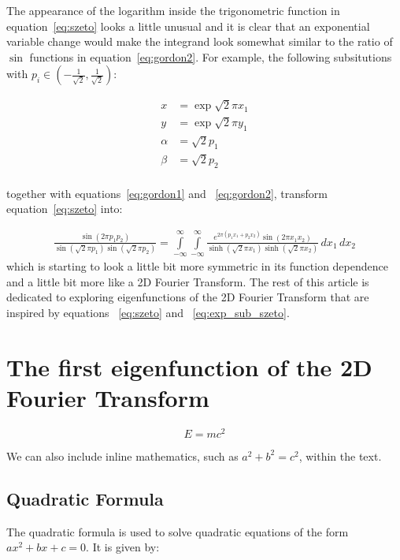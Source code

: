 \documentclass[12pt]{article}
\begin{document}
The appearance of the logarithm inside the trigonometric function in equation~\ref{eq:szeto} looks a little unusual and it is clear that an exponential variable change would make the integrand look somewhat similar to the ratio of $\sin$ functions in equation~\ref{eq:gordon2}. For example, the following subsitutions with \(p_i \in (-\frac{1}{\sqrt 2},\frac{1}{\sqrt 2}) \):

\begin{align}
  x&=\exp \sqrt 2 \pi x_1 \label{eq:x_x1_sub} \\
  y&=\exp \sqrt 2 \pi y_1 \label{eq:y_x2_sub} \\
  \alpha&= \sqrt 2 p_1 \label{eq:alpha_p1_sub} \\
  \beta&= \sqrt 2 p_2 \label{eq:beta_p2_sub} \\
\end{align}

together with equations~\ref{eq:gordon1} and ~\ref{eq:gordon2}, transform equation~\ref{eq:szeto} into:

\begin{align}
  \label{eq:exp_sub_szeto}
  \frac{\sin{\left(2 \pi {p}_{1} {p}_{2} \right)}}{\sin{\left(\sqrt{2} \pi {p}_{1} \right)} \sin{\left(\sqrt{2} \pi {p}_{2} \right)}} = \int\limits_{-\infty}^{\infty}\int\limits_{-\infty}^{\infty} \frac{e^{2 \pi \left({p}_{1} {x}_{1} + {p}_{2} {x}_{2}\right)} \sin{\left(2 \pi {x}_{1} {x}_{2} \right)}}{\sinh{\left(\sqrt{2} \pi {x}_{1} \right)} \sinh{\left(\sqrt{2} \pi {x}_{2} \right)}}\, d{x}_{1}\, d{x}_{2}
\end{align}
which is starting to look a little bit more symmetric in its function dependence and a little bit more like a 2D Fourier Transform. The rest of this article is dedicated to exploring eigenfunctions of the 2D Fourier Transform that are inspired by equations ~\ref{eq:szeto} and ~\ref{eq:exp_sub_szeto}.


\section{The first eigenfunction of the 2D Fourier Transform}


\begin{equation}
E = mc^2
\end{equation}

We can also include inline mathematics, such as \( a^2 + b^2 = c^2 \), within the text.

\subsection{Quadratic Formula}
The quadratic formula is used to solve quadratic equations of the form \( ax^2 + bx + c = 0 \). It is given by:
\end{document}
